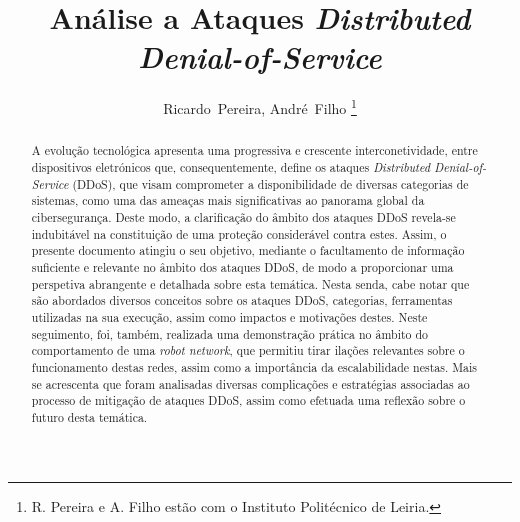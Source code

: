 \documentclass[journal]{IEEEtran}
\begin{document}
%
\title{Análise a Ataques \textit{Distributed Denial-of-Service}}

\author{Ricardo~Pereira,
  André~Filho%
  \thanks{R. Pereira e A. Filho estão com o Instituto Politécnico de Leiria.}}%

\maketitle

\renewcommand{\abstractname}{Resumo} %
\begin{abstract}
  A evolução tecnológica apresenta uma progressiva e crescente interconetividade, entre dispositivos eletrónicos que, consequentemente, define os ataques \textit{Distributed Denial-of-Service} (DDoS), que visam comprometer a disponibilidade de diversas categorias de sistemas, como uma das ameaças mais significativas ao panorama global da cibersegurança. Deste modo, a clarificação do âmbito dos ataques DDoS revela-se indubitável na constituição de uma proteção considerável contra estes. Assim, o presente documento atingiu o seu objetivo, mediante o facultamento de informação suficiente e relevante no âmbito dos ataques DDoS, de modo a proporcionar uma perspetiva abrangente e detalhada sobre esta temática. Nesta senda, cabe notar que são abordados diversos conceitos sobre os ataques DDoS, categorias, ferramentas utilizadas na sua execução, assim como impactos e motivações destes. Neste seguimento, foi, também, realizada uma demonstração prática no âmbito do comportamento de uma \textit{robot network}, que permitiu tirar ilações relevantes sobre o funcionamento destas redes, assim como a importância da escalabilidade nestas. Mais se acrescenta que foram analisadas diversas complicações e estratégias associadas ao processo de mitigação de ataques DDoS, assim como efetuada uma reflexão sobre o futuro desta temática.
\end{abstract}
\end{document}
